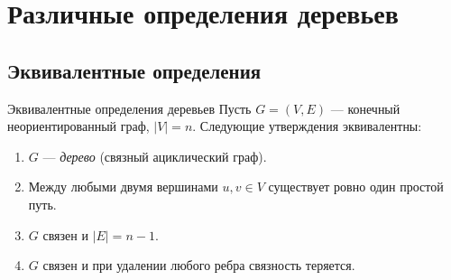 \section{Различные определения деревьев}

\subsection{Эквивалентные определения}

\begin{Statement}{Эквивалентные определения деревьев}{}
  Пусть $G=(V,E)$ — конечный неориентированный граф, $|V|=n$.
  Следующие утверждения эквивалентны:
  \begin{enumerate}
    \item[(i)]   $G$ — \emph{дерево} (связный ациклический граф).
    \item[(ii)]  Между любыми двумя вершинами $u,v\in V$ существует
                 ровно один простой путь.
    \item[(iii)] $G$ связен и $|E|=n-1$.
    \item[(iv)]  $G$ связен и при удалении любого ребра связность теряется.
  \end{enumerate}
\end{Statement}

